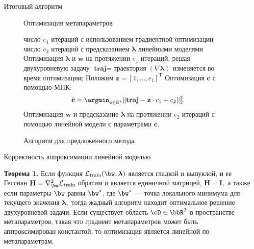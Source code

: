 \documentclass[12pt, aspectratio=169]{beamer}
\begin{document}
\begin{frame}{Итоговый алгоритм}
    \begin{figure}
    \vspace{-0.5 cm}
\begin{algorithm}[H]
\caption{Оптимизация метапараметров}
 \begin{algorithmic}[1]

 \REQUIRE число $e_1$ итераций с использованием градиентной оптимизации
 \REQUIRE число $e_2$ итераций с предсказанием $\boldsymbol{\lambda}$ линейными моделями
  \STATE Оптимизация $\boldsymbol{\lambda}$ и $\mathbf{w}$ на протяжении $e_1$ итераций, решая двухуровневую задачу
  \STATE $\textbf{traj} = $траектория $(\nabla \boldsymbol{\lambda})$ изменяется во время оптимизации;
  \STATE Положим $\mathbf{z} = [1,\dots,e_1]^\mathsf{T}$
  \STATE Оптимизация $\mathbf{c}$ с помощью МНК: 
  $$\hat{\mathbf{c}} = \argmin_{\mathbf{c} \in \mathbb{R}^2} ||\textbf{traj} - \mathbf{z}\cdot c_1 + c_2||_2^2$$
  \STATE Оптимизация $\mathbf{w}$ и предсказание $\boldsymbol{\lambda}$ на протяжении $e_2$ итераций с помощью линейной модели с параметрами $\mathbf{c}$.
  \ENDWHILE

 \end{algorithmic}
 \end{algorithm}
 \vspace{-0.5 cm}
 \caption*{Алгоритм для предложенного метода.}
 \label{algo}

 \end{figure}
\end{frame}

\begin{frame}{Корректность аппроксимации линейной моделью}

\textbf{Теорема 1.} Если функция $\mathcal{L}_{\textnormal{train}}(\bw, \boldsymbol{\lambda})$ является гладкой и выпуклой, и ее Гессиан $\mathbf{H} = \nabla_{\bw}^2 \mathcal{L}_\textnormal{train}$ обратим и является единичной матрицей, $\mathbf{H} = \mathbf{I},$ а также если параметры $\bw$ равны $\bw^*$, где $\bw^*$ --- точка локального минимума для текущего значения $\boldsymbol{\lambda},$ тогда жадный алгоритм находит оптимальное решение двухуровневой задачи. Если существует область $\cD \in \bbR^2$ в пространстве метапараметров, такая что градиент метапараметров может быть аппроксимирован константой, то оптимизация является линейной по метапараметрам.

\end{frame}
\end{document}

